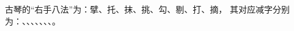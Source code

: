 \documentclass[a4paper]{ctexart}
\begin{document}
古琴的“右手八法”为：擘、托、抹、挑、勾、剔、打、摘，
其对应减字分别为：、、、、、、、。

\end{document}
